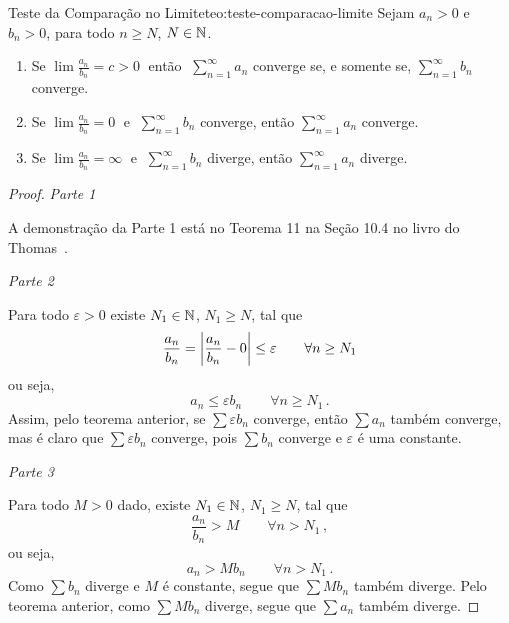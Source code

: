 \begin{teorema}{Teste da Comparação no Limite}{teo:teste-comparacao-limite}
  Sejam
  $a_n>0$ e $b_n>0$, para todo $n\geq N$, $N\in \mathbb{N}$.
  \begin{enumerate}
    \item
      Se
      \(
        \lim\frac{a_n}{b_n}=c>0
      \;\)
      então
      \(\;
        \sum_{n=1}^\infty a_n
      \)
      converge se, e somente se,
      \(
        \sum_{n=1}^\infty b_n
      \)
      converge.
    \item
      Se
      \(
        \lim\frac{a_n}{b_n}=0
      \;\) e
      \(\;
        \sum_{n=1}^\infty b_n
      \)
      converge, então
      \(
        \sum_{n=1}^\infty a_n
      \)
      converge.
    \item
      Se
      \(
        \lim\frac{a_n}{b_n}=\infty
      \;\) e
      \(\;
        \sum_{n=1}^\infty b_n
      \)
      diverge, então
      \(
        \sum_{n=1}^\infty a_n
      \)
      diverge.
  \end{enumerate}
\end{teorema}
\begin{proof}
  \emph{Parte 1}

  A demonstração da Parte 1 está no Teorema 11 na Seção 10.4 no livro do Thomas~\cite{thomas_2}.

  \emph{Parte 2}

  Para todo $\varepsilon>0$ existe $N_1\in\mathbb{N}$,  $N_1\geq N$, tal que
  \[
    \frac{a_n}{b_n} =    \abs{\frac{a_n}{b_n}-0}
                    \leq \varepsilon
    \qquad \forall n\geq N_1
  \]
  ou seja,
  \[
    a_n \leq \varepsilon b_n \qquad \forall  n\geq N_1          \,.
  \]
  Assim, pelo teorema anterior, se $\sum \varepsilon b_n$
  converge, então $\sum a_n$
  também converge, mas é claro que $\sum \varepsilon b_n$
  converge, pois $\sum b_n$
  converge e $\varepsilon$ é uma constante.

  \emph{Parte 3}

  Para todo $M>0$ dado, existe $N_1\in\mathbb{N}$, $N_1\geq N$, tal que
  \[
    \frac{a_n}{b_n}>M \qquad \forall n> N_1   \,,
  \]
  ou seja,
  \[
    a_n > M b_n \qquad \forall n > N_1     \,.
  \]
  Como $\sum b_n $ diverge e $M$ é constante, segue que $\sum M b_n$ também diverge.
  Pelo teorema anterior, como $\sum M b_n$ diverge, segue que $\sum a_n$ também diverge.
\end{proof}

